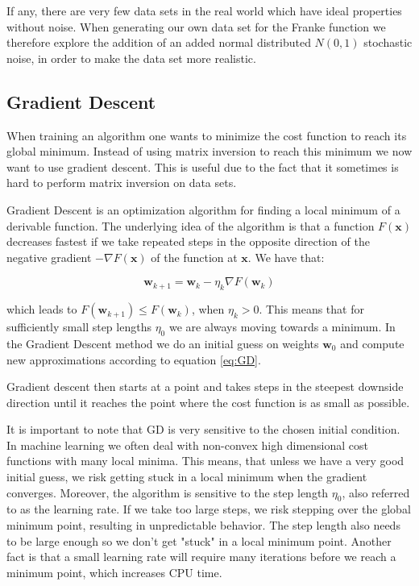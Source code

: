 \documentclass[a4paper, UKenglish, 11pt]{uiomaster}
\begin{document}
If any, there are very few data sets in the real world which have ideal properties without noise. When generating our own data set for the Franke function we therefore explore the addition of an added normal distributed $N(0,1)$ stochastic noise, in order to make the data set more realistic.

\subsection*{Gradient  Descent}

When training an algorithm one wants to minimize the cost function to reach its global minimum. Instead of using matrix inversion to reach this minimum we now want to use gradient descent. This is useful due to the fact that it sometimes is hard to perform matrix inversion on data sets.

Gradient Descent is an optimization algorithm for finding a local minimum of a derivable function. The underlying idea of the algorithm is that a function $F(\textbf{x})$ decreases fastest if we take repeated steps in the opposite direction of the negative gradient $-\nabla F(\textbf{x})$ of the function at $\textbf{x}$. We have that:

\begin{equation}
    \textbf{w}_{k+1} = \textbf{w}_k - \eta_k\nabla F(\textbf{w}_k)
    \label{eq:GD}
\end{equation}

which leads to $F(\textbf{w}_{k+1}) \leq F(\textbf{w}_{k})$, when $\eta_k > 0$. This means that for sufficiently small step lengths $\eta_0$ we are always moving towards a minimum. In the Gradient Descent method we do an initial guess on weights $\textbf{w}_0$ and compute new approximations according to equation \ref{eq:GD}.

Gradient descent then starts at a point and takes steps in the steepest downside direction until it reaches the point where the cost function is as small as possible.

It is important to note that GD is very sensitive to the chosen initial condition. In machine learning we often deal with non-convex high dimensional cost functions with many local minima. This means, that unless we have a very good initial guess, we risk getting stuck in a local minimum when the gradient converges. Moreover, the algorithm is sensitive to the step length $\eta_0$, also referred to as the learning rate. If we take too large steps, we risk stepping over the global minimum point, resulting in unpredictable behavior. The step length also needs to be large enough so we don't get "stuck" in a local minimum point. Another fact is that a small learning rate will require many iterations before we reach a minimum point, which increases CPU time.
\end{document}
